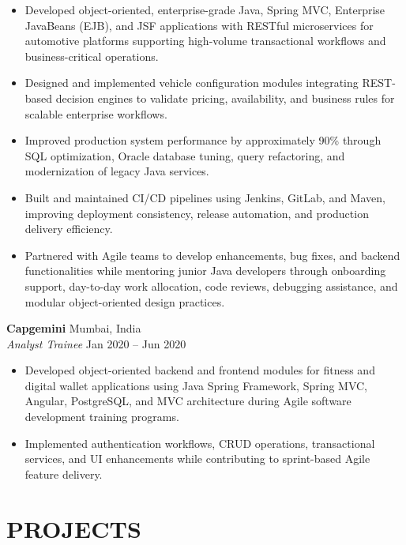 \documentclass[12pt]{article}
\begin{document}
\begin{itemize}
    \item Developed object-oriented, enterprise-grade Java, Spring MVC, Enterprise JavaBeans (EJB), and JSF applications with RESTful microservices for automotive platforms supporting high-volume transactional workflows and business-critical operations.
    
    \item Designed and implemented vehicle configuration modules integrating REST-based decision engines to validate pricing, availability, and business rules for scalable enterprise workflows.
    
    \item Improved production system performance by approximately 90\% through SQL optimization, Oracle database tuning, query refactoring, and modernization of legacy Java services.
    
    \item Built and maintained CI/CD pipelines using Jenkins, GitLab, and Maven, improving deployment consistency, release automation, and production delivery efficiency.
    
    \item Partnered with Agile teams to develop enhancements, bug fixes, and backend functionalities while mentoring junior Java developers through onboarding support, day-to-day work allocation, code reviews, debugging assistance, and modular object-oriented design practices.
\end{itemize}

\textbf{Capgemini} \hfill Mumbai, India \\
\textit{Analyst Trainee} \hfill Jan 2020 -- Jun 2020

\begin{itemize}
    \item Developed object-oriented backend and frontend modules for fitness and digital wallet applications using Java Spring Framework, Spring MVC, Angular, PostgreSQL, and MVC architecture during Agile software development training programs.
    
    \item Implemented authentication workflows, CRUD operations, transactional services, and UI enhancements while contributing to sprint-based Agile feature delivery.
\end{itemize}

\section*{PROJECTS}
\end{document}
